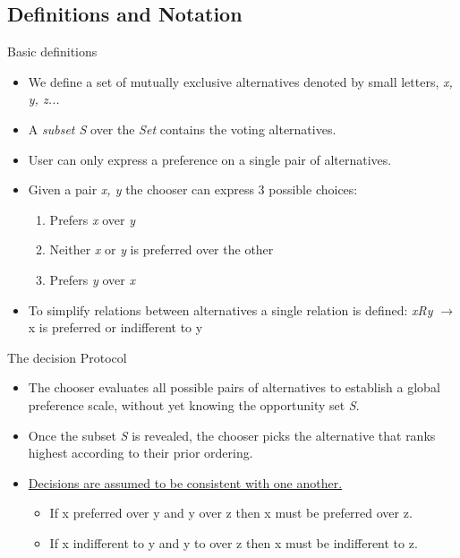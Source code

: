 \documentclass{beamer}
\begin{document}
\subsection{Definitions and Notation}
\begin{frame}{Basic definitions}
    \begin{itemize}
        \item We define a set of mutually exclusive alternatives denoted by small letters, \textit{x, y, z...}
        \item A \textit{subset S} over the \textit{Set} contains the voting alternatives.
        \item User can only express a preference on a single pair of alternatives.
        \item Given a pair \textit{x, y} the chooser can express 3 possible choices:
        \begin{enumerate}
            \item Prefers \textit{x} over \textit{y}
            \item Neither \textit{x} or \textit{y} is preferred over the other 
            \item Prefers \textit{y} over \textit{x}
        \end{enumerate}
        \vspace{0.25 cm}
        \item To simplify relations between alternatives a single relation is defined:
        \textit{xRy} $\rightarrow$ x is preferred or indifferent to y
        
    \end{itemize}
\end{frame}

\begin{frame}{The decision Protocol}
    \begin{itemize}
        \item The chooser evaluates all possible pairs of alternatives to establish a global preference scale, without yet knowing the opportunity set \textit{S}.
        \item Once the subset \textit{S} is revealed, the chooser picks the alternative that ranks highest according to their prior ordering.
        \vspace{0.25 cm}
        \item \underline{Decisions are assumed to be consistent with one another.}
        \begin{itemize}
            \item If x preferred over y and y over z then x must be preferred over z.
            \item If x indifferent to y and y to over z then x must be indifferent to z.
        \end{itemize}
    \end{itemize}
\end{frame}
\end{document}
